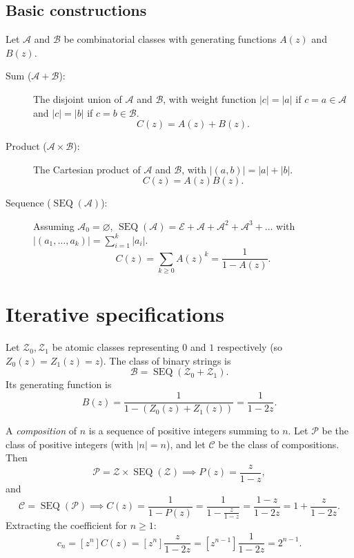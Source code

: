 \subsection*{Basic constructions}
Let \(\mathcal{A}\) and \(\mathcal{B}\) be combinatorial classes with generating functions \(A(z)\) and \(B(z)\).
\begin{description}
    \item[Sum (\(\mathcal{A} + \mathcal{B}\)):]
    The disjoint union of \(\mathcal{A}\) and \(\mathcal{B}\), with weight function \(|c| = |a|\) if \(c = a \in \mathcal{A}\) and \(|c| = |b|\) if \(c = b \in \mathcal{B}\).
    \[
        C(z) = A(z) + B(z).
    \]
    \item[Product (\(\mathcal{A} \times \mathcal{B}\)):]
    The Cartesian product of \(\mathcal{A}\) and \(\mathcal{B}\), with \(|(a,b)| = |a| + |b|\).
    \[
        C(z) = A(z) B(z).
    \]
    \item[Sequence (\(\operatorname{SEQ}(\mathcal{A})\)):]
    Assuming \(\mathcal{A}_0 = \varnothing\), \(\operatorname{SEQ}(\mathcal{A}) = \mathcal{E} + \mathcal{A} + \mathcal{A}^2 + \mathcal{A}^3 + \dots\) with \(|(a_1, \dots, a_k)| = \sum_{i=1}^k |a_i|\).
    \[
        C(z) = \sum_{k\ge 0} A(z)^k = \frac{1}{1 - A(z)}.
    \]
\end{description}

\section*{Iterative specifications}

\begin{example}
Let \(\mathcal{Z}_0, \mathcal{Z}_1\) be atomic classes representing \(0\) and \(1\) respectively (so \(Z_0(z) = Z_1(z) = z\)).
The class of binary strings is
\[
    \mathcal{B} = \operatorname{SEQ}(\mathcal{Z}_0 + \mathcal{Z}_1).
\]
Its generating function is
\[
    B(z) = \frac{1}{1 - (Z_0(z) + Z_1(z))} = \frac{1}{1 - 2z}.
\]
\end{example}

\begin{example}
A \emph{composition} of \(n\) is a sequence of positive integers summing to \(n\).
Let \(\mathcal{P}\) be the class of positive integers (with \(|n| = n\)), and let \(\mathcal{C}\) be the class of compositions.
Then
\[
    \mathcal{P} = \mathcal{Z} \times \operatorname{SEQ}(\mathcal{Z}) \implies P(z) = \frac{z}{1-z},
\]
and
\[
    \mathcal{C} = \operatorname{SEQ}(\mathcal{P}) \implies C(z) = \frac{1}{1 - P(z)} = \frac{1}{1 - \frac{z}{1-z}} = \frac{1-z}{1-2z} = 1 + \frac{z}{1-2z}.
\]
Extracting the coefficient for \(n \ge 1\):
\[
    c_n = [z^n] C(z) = [z^n] \frac{z}{1-2z} = [z^{n-1}] \frac{1}{1-2z} = 2^{n-1}.
\]
\end{example}